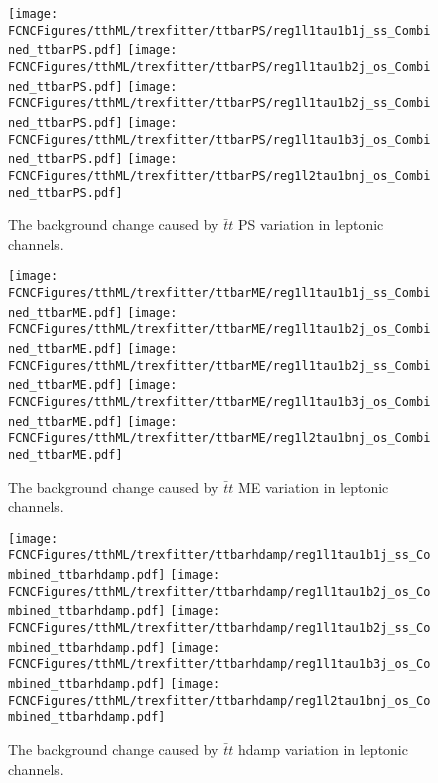 \begin{figure}[H]
\centering
\texttt{[image: \\FCNCFigures/tthML/trexfitter/ttbarPS/reg1l1tau1b1j\_ss\_Combined\_ttbarPS.pdf]}
\texttt{[image: \\FCNCFigures/tthML/trexfitter/ttbarPS/reg1l1tau1b2j\_os\_Combined\_ttbarPS.pdf]}
\texttt{[image: \\FCNCFigures/tthML/trexfitter/ttbarPS/reg1l1tau1b2j\_ss\_Combined\_ttbarPS.pdf]}
\texttt{[image: \\FCNCFigures/tthML/trexfitter/ttbarPS/reg1l1tau1b3j\_os\_Combined\_ttbarPS.pdf]}
\texttt{[image: \\FCNCFigures/tthML/trexfitter/ttbarPS/reg1l2tau1bnj\_os\_Combined\_ttbarPS.pdf]}
\caption{The background change caused by $\bar{t}t$ PS variation in leptonic channels.}
\label{fig:tthML_ttbarPS}
\end{figure}

\begin{figure}[H]
\centering
\texttt{[image: \\FCNCFigures/tthML/trexfitter/ttbarME/reg1l1tau1b1j\_ss\_Combined\_ttbarME.pdf]}
\texttt{[image: \\FCNCFigures/tthML/trexfitter/ttbarME/reg1l1tau1b2j\_os\_Combined\_ttbarME.pdf]}
\texttt{[image: \\FCNCFigures/tthML/trexfitter/ttbarME/reg1l1tau1b2j\_ss\_Combined\_ttbarME.pdf]}
\texttt{[image: \\FCNCFigures/tthML/trexfitter/ttbarME/reg1l1tau1b3j\_os\_Combined\_ttbarME.pdf]}
\texttt{[image: \\FCNCFigures/tthML/trexfitter/ttbarME/reg1l2tau1bnj\_os\_Combined\_ttbarME.pdf]}
\caption{The background change caused by $\bar{t}t$ ME variation in leptonic channels.}
\label{fig:tthML_ttbarME}
\end{figure}

\begin{figure}[H]
\centering
\texttt{[image: \\FCNCFigures/tthML/trexfitter/ttbarhdamp/reg1l1tau1b1j\_ss\_Combined\_ttbarhdamp.pdf]}
\texttt{[image: \\FCNCFigures/tthML/trexfitter/ttbarhdamp/reg1l1tau1b2j\_os\_Combined\_ttbarhdamp.pdf]}
\texttt{[image: \\FCNCFigures/tthML/trexfitter/ttbarhdamp/reg1l1tau1b2j\_ss\_Combined\_ttbarhdamp.pdf]}
\texttt{[image: \\FCNCFigures/tthML/trexfitter/ttbarhdamp/reg1l1tau1b3j\_os\_Combined\_ttbarhdamp.pdf]}
\texttt{[image: \\FCNCFigures/tthML/trexfitter/ttbarhdamp/reg1l2tau1bnj\_os\_Combined\_ttbarhdamp.pdf]}
\caption{The background change caused by $\bar{t}t$ hdamp variation in leptonic channels.}
\label{fig:tthML_ttbarhdamp}
\end{figure}


